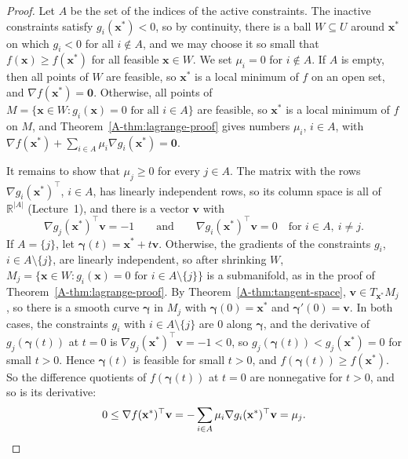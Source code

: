 \begin{proof}
    Let $A$ be the set of the indices of the active constraints. The inactive constraints satisfy $g_i(\mathbf{x}^*) < 0$, so by continuity, there is a ball $W \subseteq U$ around $\mathbf{x}^*$ on which $g_i < 0$ for all $i \notin A$, and we may choose it so small that $f(\mathbf{x}) \geq f(\mathbf{x}^*)$ for all feasible $\mathbf{x} \in W$. We set $\mu_i = 0$ for $i \notin A$. If $A$ is empty, then all points of $W$ are feasible, so $\mathbf{x}^*$ is a local minimum of $f$ on an open set, and $\nabla f(\mathbf{x}^*) = \mathbf{0}$. Otherwise, all points of $M = \{\mathbf{x} \in W : g_i(\mathbf{x}) = 0 \text{ for all } i \in A\}$ are feasible, so $\mathbf{x}^*$ is a local minimum of $f$ on $M$, and Theorem~\ref{A-thm:lagrange-proof} gives numbers $\mu_i$, $i \in A$, with $\nabla f(\mathbf{x}^*) + \sum_{i \in A} \mu_i\nabla g_i(\mathbf{x}^*) = \mathbf{0}$.

    It remains to show that $\mu_j \geq 0$ for every $j \in A$. The matrix with the rows $\nabla g_i(\mathbf{x}^*)^\top$, $i \in A$, has linearly independent rows, so its column space is all of $\mathbb{R}^{|A|}$ (Lecture~1), and there is a vector $\mathbf{v}$ with
    \[\nabla g_j(\mathbf{x}^*)^\top\mathbf{v} = -1 \qquad \text{and} \qquad \nabla g_i(\mathbf{x}^*)^\top\mathbf{v} = 0 \quad \text{for } i \in A, \ i \neq j.\]
    If $A = \{j\}$, let $\boldsymbol{\gamma}(t) = \mathbf{x}^* + t\mathbf{v}$. Otherwise, the gradients of the constraints $g_i$, $i \in A \setminus \{j\}$, are linearly independent, so after shrinking $W$, $M_j = \{\mathbf{x} \in W : g_i(\mathbf{x}) = 0 \text{ for } i \in A \setminus \{j\}\}$ is a submanifold, as in the proof of Theorem~\ref{A-thm:lagrange-proof}. By Theorem~\ref{A-thm:tangent-space}, $\mathbf{v} \in T_{\mathbf{x}^*}M_j$, so there is a smooth curve $\boldsymbol{\gamma}$ in $M_j$ with $\boldsymbol{\gamma}(0) = \mathbf{x}^*$ and $\boldsymbol{\gamma}'(0) = \mathbf{v}$. In both cases, the constraints $g_i$ with $i \in A \setminus \{j\}$ are $0$ along $\boldsymbol{\gamma}$, and the derivative of $g_j(\boldsymbol{\gamma}(t))$ at $t = 0$ is $\nabla g_j(\mathbf{x}^*)^\top\mathbf{v} = -1 < 0$, so $g_j(\boldsymbol{\gamma}(t)) < g_j(\mathbf{x}^*) = 0$ for small $t > 0$. Hence $\boldsymbol{\gamma}(t)$ is feasible for small $t > 0$, and $f(\boldsymbol{\gamma}(t)) \geq f(\mathbf{x}^*)$. So the difference quotients of $f(\boldsymbol{\gamma}(t))$ at $t = 0$ are nonnegative for $t > 0$, and so is its derivative:
    \[0 \leq \nabla f(\mathbf{x}^*)^\top\mathbf{v} = -\sum_{i \in A} \mu_i\nabla g_i(\mathbf{x}^*)^\top\mathbf{v} = \mu_j. \qedhere\]
\end{proof}

